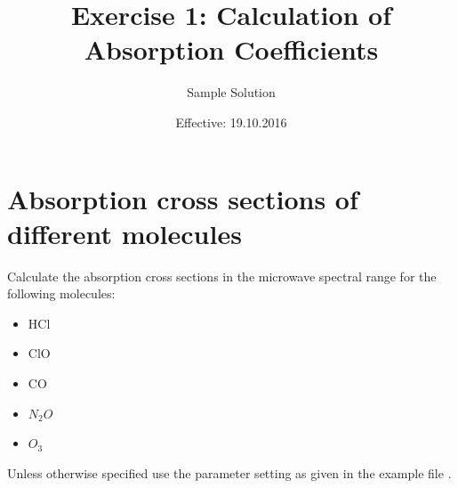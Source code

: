 \documentclass[paper=a4, fontsize=11pt]{scrartcl} %
\title{Exercise 1: Calculation of Absorption Coefficients}
\author{Sample Solution}
\date{Effective: 19.10.2016}
\begin{document}
\maketitle

\section{Absorption cross sections of different molecules}
Calculate the absorption cross sections in the microwave spectral range for the
following molecules:
\begin{itemize}
    \item HCl
    \item ClO
    \item CO
    \item $N_{2}O$
    \item $O_{3}$
\end{itemize}
Unless otherwise specified use the parameter setting as given in the example
file .
\end{document}
